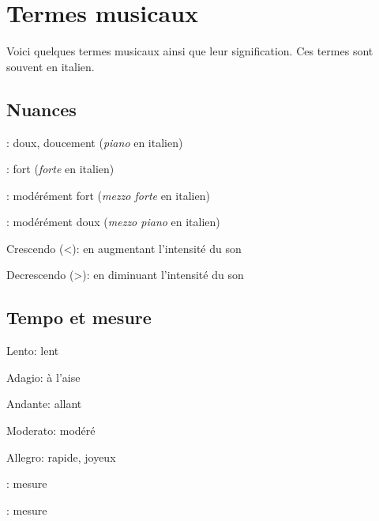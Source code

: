 \documentclass[11pt,a4paper]{scrreprt}
\begin{document}
\chapter{Termes musicaux}

Voici quelques termes musicaux ainsi que leur signification. Ces termes sont souvent en italien.

\section{Nuances}
\begin{description}
\item \fetap : doux, doucement (\emph{piano} en italien)
\item \fetaf : fort (\emph{forte} en italien)
\item \fetamf : modérément fort (\emph{mezzo forte} en italien)
\item \fetamp : modérément doux (\emph{mezzo piano} en italien)
\item Crescendo (<): en augmentant l'intensité du son
\item Decrescendo (>): en diminuant l'intensité du son
\end{description}

\section{Tempo et mesure}
\begin{description}
\item Lento: lent
\item Adagio: à l'aise
\item Andante: allant
\item Moderato: modéré
\item Allegro: rapide, joyeux
\item {}: mesure 
\item {}: mesure 
\end{description}
\end{document}

